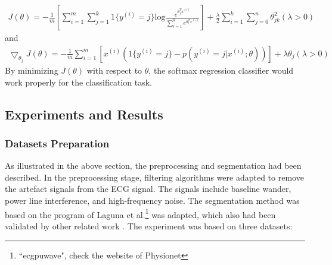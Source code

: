 \documentclass[graybox]{svmult}
\begin{document}
\begin{equation}
\begin{split}
J(\theta) = -\frac{1}{m}[\sum_{i=1}^m\sum_{j=1}^k1\{y^{(i)}=j\}\text{log}{\frac{e^{\theta_j^Tx^{(i)}}}{\sum_{l=1}^ke^{\theta_l^Tx^{(i)}}}}] 
+ \frac{\lambda}{2} \sum_{i=1}^k \sum_{j=0}^n \theta_{jk}^2 (\lambda>0)
\end{split}
\end{equation}
and
\begin{equation}
\begin{split}
\bigtriangledown_{\theta_j}J(\theta) = -\frac{1}{m}\sum_{i=1}^m[x^{(i)}(1\{y^{(i)}=j\}-p(y^{(i)}=j|x^{(i)};\theta))] 
+ \lambda\theta_j  (\lambda>0)
\end{split}
\end{equation}
By minimizing $J(\theta)$ with respect to $\theta$, the softmax regression classifier would work properly for the classification task.

\subsection{Experiments and Results}
\subsubsection{Datasets Preparation}
As illustrated in the above section, the preprocessing and segmentation had been described. In the preprocessing stage, filtering algorithms were adapted to remove the artefact signals from the ECG signal. The signals include baseline wander, power line interference, and high-frequency noise. The segmentation method was based on the program of Laguna et al.\footnote{``ecgpuwave", check the website of Physionet} was adapted, which also had been validated by other related work \cite{de2004automatic}.
The experiment was based on three datasets:
\end{document}

